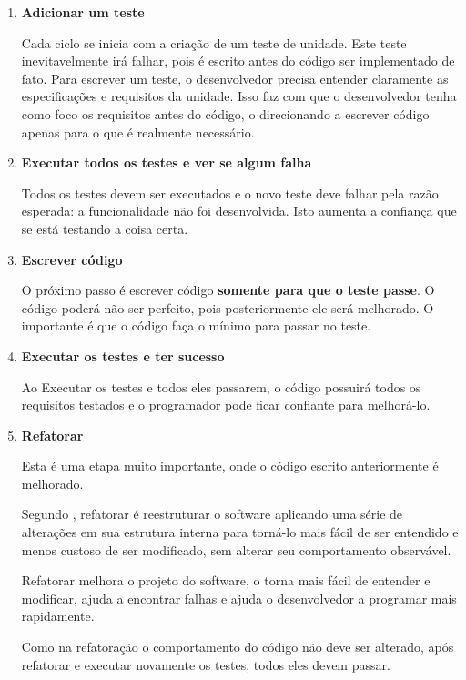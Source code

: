 \begin{enumerate}
\item \textbf{Adicionar um teste}

Cada ciclo se inicia com a criação de um teste de unidade. Este teste inevitavelmente irá falhar, pois é escrito antes do código ser implementado de fato. Para escrever um teste, o desenvolvedor precisa entender claramente as especificações e requisitos da unidade. Isso faz com que o desenvolvedor tenha como foco os requisitos antes do código, o direcionando a escrever código apenas para o que é realmente necessário.

\item \textbf{Executar todos os testes e ver se algum falha}

Todos os testes devem ser executados e o novo teste deve falhar pela razão esperada: a funcionalidade não foi desenvolvida. Isto aumenta a confiança que se está testando a coisa certa.

\item \textbf{Escrever código}

O próximo passo é escrever código \textbf{somente para que o teste passe}. O código poderá não ser perfeito, pois posteriormente ele será melhorado. O importante é que o código faça o mínimo para passar no teste.

\item \textbf{Executar os testes e ter sucesso}

Ao Executar os testes e todos eles passarem, o código possuirá todos os requisitos testados e o programador pode ficar confiante para melhorá-lo.

\item \textbf{Refatorar}

Esta é uma etapa muito importante, onde o código escrito anteriormente é melhorado.

Segundo , refatorar é reestruturar o software aplicando uma série de alterações em sua estrutura interna para torná-lo mais fácil de ser entendido e menos custoso de ser modificado, sem alterar seu comportamento observável.

Refatorar melhora o projeto do software, o torna mais fácil de entender e modificar, ajuda a encontrar falhas e ajuda o desenvolvedor a programar mais rapidamente.

Como na refatoração o comportamento do código não deve ser alterado, após refatorar e executar novamente os testes, todos eles devem passar.

\end{enumerate}

